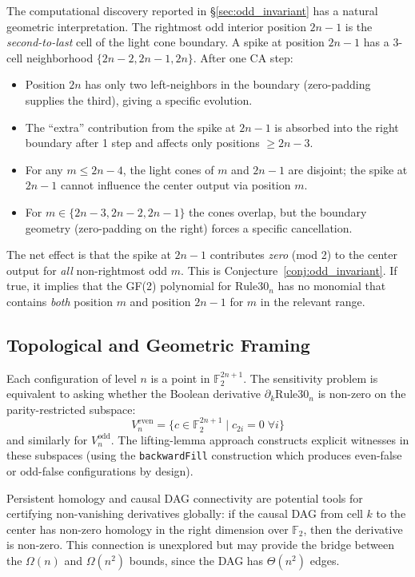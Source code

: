 \documentclass[11pt]{article}
\begin{document}
The computational discovery reported in \S\ref{sec:odd_invariant} has a natural geometric interpretation. The rightmost odd interior position $2n-1$ is the \emph{second-to-last} cell of the light cone boundary. A spike at position $2n-1$ has a 3-cell neighborhood $\{2n-2, 2n-1, 2n\}$. After one CA step:
\begin{itemize}
    \item Position $2n$ has only two left-neighbors in the boundary (zero-padding supplies the third), giving a specific evolution.
    \item The ``extra'' contribution from the spike at $2n-1$ is absorbed into the right boundary after 1 step and affects only positions $\geq 2n-3$.
    \item For any $m \leq 2n-4$, the light cones of $m$ and $2n-1$ are disjoint; the spike at $2n-1$ cannot influence the center output via position $m$.
    \item For $m \in \{2n-3, 2n-2, 2n-1\}$ the cones overlap, but the boundary geometry (zero-padding on the right) forces a specific cancellation.
\end{itemize}

The net effect is that the spike at $2n-1$ contributes \emph{zero} (mod 2) to the center output for \emph{all} non-rightmost odd $m$. This is Conjecture~\ref{conj:odd_invariant}. If true, it implies that the GF(2) polynomial for $\mathrm{Rule30}_n$ has no monomial that contains \emph{both} position $m$ and position $2n-1$ for $m$ in the relevant range.

\subsection{Topological and Geometric Framing}

Each configuration of level $n$ is a point in $\mathbb{F}_2^{2n+1}$. The sensitivity problem is equivalent to asking whether the Boolean derivative $\partial_k \mathrm{Rule30}_n$ is non-zero on the parity-restricted subspace:
\[
  V_n^{\mathrm{even}} = \{ c \in \mathbb{F}_2^{2n+1} \mid c_{2i} = 0 \;\forall i \}
\]
and similarly for $V_n^{\mathrm{odd}}$. The lifting-lemma approach constructs explicit witnesses in these subspaces (using the \texttt{backwardFill} construction which produces even-false or odd-false configurations by design).

Persistent homology and causal DAG connectivity are potential tools for certifying non-vanishing derivatives globally: if the causal DAG from cell $k$ to the center has non-zero homology in the right dimension over $\mathbb{F}_2$, then the derivative is non-zero. This connection is unexplored but may provide the bridge between the $\Omega(n)$ and $\Omega(n^2)$ bounds, since the DAG has $\Theta(n^2)$ edges.
\end{document}
